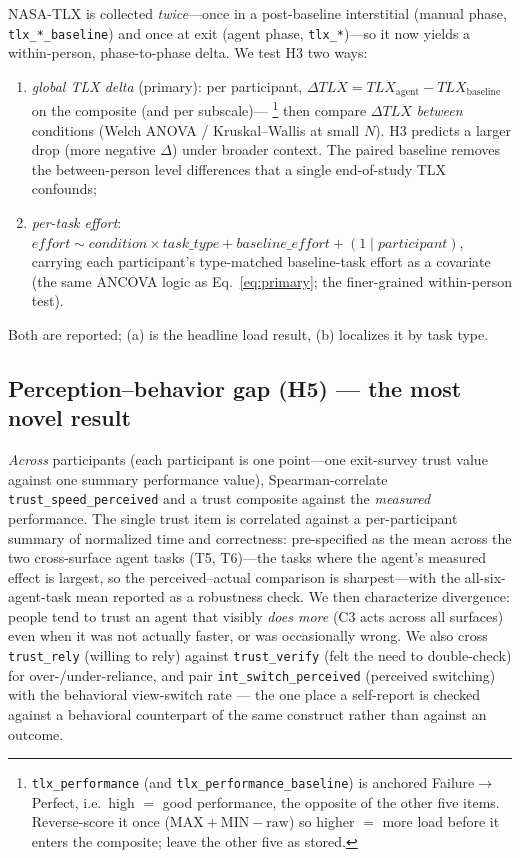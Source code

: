 \documentclass[11pt]{article}
\newcommand{\code}[1]{\texttt{#1}}
\begin{document}
NASA-TLX is collected \emph{twice}---once in a post-baseline interstitial (manual
phase, \code{tlx\_*\_baseline}) and once at exit (agent phase, \code{tlx\_*})---so
it now yields a within-person, phase-to-phase delta. We test H3 two ways:
\begin{enumerate}[nosep,label=(\alph*)]
  \item \emph{global TLX delta} (primary): per participant,
  $\Delta\textit{TLX} = \textit{TLX}_{\text{agent}} - \textit{TLX}_{\text{baseline}}$
  on the composite (and per subscale)---%
  \footnote{\code{tlx\_performance} (and \code{tlx\_performance\_baseline}) is
  anchored Failure$\rightarrow$Perfect, i.e.\ high $=$ good performance, the
  opposite of the other five items. Reverse-score it once
  ($\text{MAX}+\text{MIN}-\text{raw}$) so higher $=$ more load before it enters
  the composite; leave the other five as stored.}
  then compare $\Delta\textit{TLX}$
  \emph{between} conditions (Welch ANOVA / Kruskal--Wallis at small $N$). H3
  predicts a larger drop (more negative $\Delta$) under broader context. The
  paired baseline removes the between-person level differences that a single
  end-of-study TLX confounds;
  \item \emph{per-task effort}: $\textit{effort} \sim \textit{condition} \times
  \textit{task\_type} + \textit{baseline\_effort} + (1\mid\textit{participant})$,
  carrying each participant's type-matched baseline-task effort as a covariate
  (the same ANCOVA logic as Eq.~\eqref{eq:primary}; the finer-grained
  within-person test).
\end{enumerate}
Both are reported; (a) is the headline load result, (b) localizes it by task type.

\subsection{Perception--behavior gap (H5) --- the most novel result}

\emph{Across} participants (each participant is one point---one exit-survey
trust value against one summary performance value), Spearman-correlate
\code{trust\_speed\_perceived} and a trust composite against the \emph{measured}
performance. The single trust item is correlated against a per-participant
summary of normalized time and correctness: pre-specified as the mean across the
two cross-surface agent tasks (T5, T6)---the tasks where the agent's measured
effect is largest, so the perceived--actual comparison is sharpest---with the
all-six-agent-task mean reported as a robustness check. We then characterize
divergence: people tend to trust an agent that visibly \emph{does
more} (C3 acts across all surfaces) even when it was not actually faster, or was
occasionally wrong. We also cross \code{trust\_rely} (willing to rely) against
\code{trust\_verify} (felt the need to double-check) for over-/under-reliance,
and pair \code{int\_switch\_perceived} (perceived switching) with the behavioral
view-switch rate --- the one place a self-report is checked against a behavioral
counterpart of the same construct rather than against an outcome.
\end{document}
